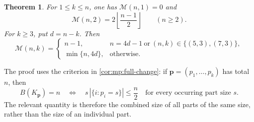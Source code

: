 \documentclass[10pt,a4paper]{amsart}
\numberwithin{equation}{section}
\newtheorem{theorem}{Theorem}[section]
\theoremstyle{definition}
\theoremstyle{remark}
\begin{document}
\begin{theorem}
\label{ext:ordinary}
For $1\le k\le n$, one has $\mathcal M(n,1)=0$ and
\[
  \mathcal M(n,2)=2\left\lfloor\frac{n-1}{2}\right\rfloor
  \qquad(n\ge2).
\]
For $k\ge3$, put $d=n-k$.  Then
\[
  \mathcal M(n,k)=
  \begin{cases}
    n-1,& n=4d-1\ \text{or}\ (n,k)\in\{(5,3),(7,3)\},\\[2pt]
    \min\{n,4d\},&\text{otherwise}.
  \end{cases}
\]
\end{theorem}

The proof uses the criterion in \cref{cor:mp:full-change}:
if $\mathbf p=(p_1,\ldots,p_k)$ has total $n$, then
\begin{equation}
\label{ext:full-change}
 B(K_{\mathbf p})=n
 \quad\Longleftrightarrow\quad
 s\,|\{i:p_i=s\}|\le\frac n2
 \quad\text{for every occurring part size }s.
\end{equation}
The relevant quantity is therefore the combined size of all parts of
the same size, rather than the size of an individual part.
\end{document}
